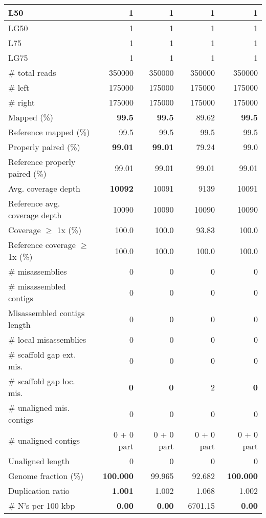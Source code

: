 \documentclass[12pt,a4paper]{article}
\begin{document}
\begin{table}[ht]
\begin{center}
\begin{tabular}{|l*{4}{|r}|}
L50 & 1 & 1 & 1 & 1 \\ \hline
LG50 & 1 & 1 & 1 & 1 \\ \hline
L75 & 1 & 1 & 1 & 1 \\ \hline
LG75 & 1 & 1 & 1 & 1 \\ \hline
\# total reads & 350000 & 350000 & 350000 & 350000 \\ \hline
\# left & 175000 & 175000 & 175000 & 175000 \\ \hline
\# right & 175000 & 175000 & 175000 & 175000 \\ \hline
Mapped (\%) & {\bf 99.5} & {\bf 99.5} & 89.62 & {\bf 99.5} \\ \hline
Reference mapped (\%) & 99.5 & 99.5 & 99.5 & 99.5 \\ \hline
Properly paired (\%) & {\bf 99.01} & {\bf 99.01} & 79.24 & 99.0 \\ \hline
Reference properly paired (\%) & 99.01 & 99.01 & 99.01 & 99.01 \\ \hline
Avg. coverage depth & {\bf 10092} & 10091 & 9139 & 10091 \\ \hline
Reference avg. coverage depth & 10090 & 10090 & 10090 & 10090 \\ \hline
Coverage $\geq$ 1x (\%) & 100.0 & 100.0 & 93.83 & 100.0 \\ \hline
Reference coverage $\geq$ 1x (\%) & 100.0 & 100.0 & 100.0 & 100.0 \\ \hline
\# misassemblies & 0 & 0 & 0 & 0 \\ \hline
\# misassembled contigs & 0 & 0 & 0 & 0 \\ \hline
Misassembled contigs length & 0 & 0 & 0 & 0 \\ \hline
\# local misassemblies & 0 & 0 & 0 & 0 \\ \hline
\# scaffold gap ext. mis. & 0 & 0 & 0 & 0 \\ \hline
\# scaffold gap loc. mis. & {\bf 0} & {\bf 0} & 2 & {\bf 0} \\ \hline
\# unaligned mis. contigs & 0 & 0 & 0 & 0 \\ \hline
\# unaligned contigs & 0 + 0 part & 0 + 0 part & 0 + 0 part & 0 + 0 part \\ \hline
Unaligned length & 0 & 0 & 0 & 0 \\ \hline
Genome fraction (\%) & {\bf 100.000} & 99.965 & 92.682 & {\bf 100.000} \\ \hline
Duplication ratio & {\bf 1.001} & 1.002 & 1.068 & 1.002 \\ \hline
\# N's per 100 kbp & {\bf 0.00} & {\bf 0.00} & 6701.15 & {\bf 0.00} \\ \hline

\end{tabular}
\end{center}
\end{table}
\end{document}
